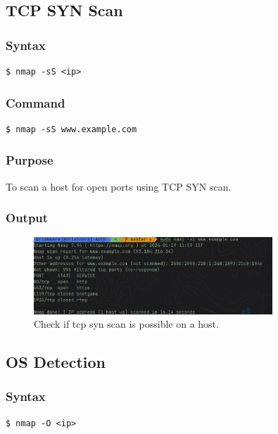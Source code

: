 \documentclass[11pt]{article}
\begin{document}
\subsection{TCP SYN Scan}

\subsubsection{Syntax}
\begin{verbatim}
$ nmap -sS <ip>
\end{verbatim}

\subsubsection*{Command}
\begin{verbatim}
$ nmap -sS www.example.com
\end{verbatim}

\subsubsection*{Purpose}
To scan a host for open ports using TCP SYN scan.

\subsubsection*{Output}
\begin{figure}[H]
    \centering
    \includegraphics[width=0.8\textwidth]{nmap tcp syn.png}
    \caption{Check if tcp syn scan is possible on a host. }
    \label{fig:1}
\end{figure}

\subsection{OS Detection}

\subsubsection{Syntax}
\begin{verbatim}
$ nmap -O <ip>
\end{verbatim}
\end{document}
